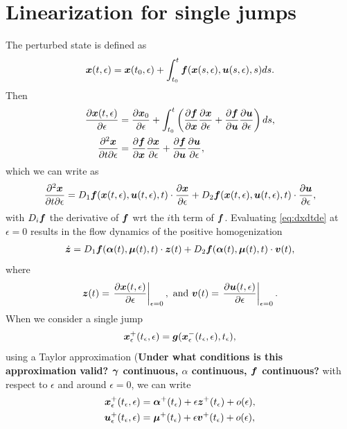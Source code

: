 \documentclass[DC2017114Bouma.tex]{subfiles}
\begin{document}
\section{Linearization for single jumps}
The perturbed state is defined as
\begin{align}
{\boldsymbol{x}}(t,\epsilon) = {\boldsymbol{x}}(t_0,\epsilon) + \int_{t_0}^{t}{\boldsymbol{f}}({\boldsymbol{x}}(s,\epsilon),{\boldsymbol{u}}(s,\epsilon),s)ds.
\end{align}
Then
\begin{align}
\frac{\partial{\boldsymbol{x}}(t,\epsilon)}{\partial\epsilon} &= \frac{\partial{\boldsymbol{x}}_0}{\partial\epsilon} + \int_{t_0}^{t}\left(\frac{\partial{\boldsymbol{f}}}{\partial{\boldsymbol{x}}}\frac{\partial{\boldsymbol{x}}}{\partial\epsilon} + \frac{\partial{\boldsymbol{f}}}{\partial{\boldsymbol{u}}}\frac{\partial{\boldsymbol{u}}}{\partial\epsilon}\right)ds,\\
\frac{\partial^2{\boldsymbol{x}}}{\partial t\partial\epsilon} &= \frac{\partial{\boldsymbol{f}}}{\partial{\boldsymbol{x}}}\frac{\partial{\boldsymbol{x}}}{\partial\epsilon} + \frac{\partial{\boldsymbol{f}}}{\partial{\boldsymbol{u}}}\frac{\partial{\boldsymbol{u}}}{\partial\epsilon},
\end{align}
which we can write as
\begin{align}
\frac{\partial^2{\boldsymbol{x}}}{\partial t\partial\epsilon} = D_1{\boldsymbol{f}}({\boldsymbol{x}}(t,\epsilon),{\boldsymbol{u}}(t,\epsilon),t)\cdot \frac{\partial{\boldsymbol{x}}}{\partial\epsilon} + D_2{\boldsymbol{f}}({\boldsymbol{x}}(t,\epsilon),{\boldsymbol{u}}(t,\epsilon),t)\cdot \frac{\partial{\boldsymbol{u}}}{\partial\epsilon}, \label{eq:dxdtde}
\end{align}
with $D_i{\boldsymbol{f}}$ the derivative of ${\boldsymbol{f}}$ wrt the $i$th term of ${\boldsymbol{f}}$. Evaluating \eqref{eq:dxdtde} at $\epsilon = 0$ results in the flow dynamics of the positive homogenization
\begin{align}
\dot{{\boldsymbol{z}}} = D_1{\boldsymbol{f}}(\boldsymbol{\alpha}(t),\boldsymbol{\mu}(t),t)\cdot {\boldsymbol{z}}(t) + D_2{\boldsymbol{f}}(\boldsymbol{\alpha}(t),\boldsymbol{\mu}(t),t)\cdot {\boldsymbol{v}}(t),
\end{align}
where 
\begin{align}
{\boldsymbol{z}}(t) = \left.\frac{\partial{\boldsymbol{x}}(t,\epsilon)}{\partial\epsilon}\right|_{\epsilon=0},\text{ and } {\boldsymbol{v}}(t) = \left.\frac{\partial{\boldsymbol{u}}(t,\epsilon)}{\partial\epsilon}\right|_{\epsilon=0} .
\end{align}
When we consider a single jump
\begin{align}
{\boldsymbol{x}}^{+}_\epsilon(t_\epsilon,\epsilon) = {\boldsymbol{g}}({\boldsymbol{x}}^{-}_\epsilon(t_\epsilon,\epsilon),t_\epsilon),\label{eq:g}
\end{align}
using a Taylor approximation (\textbf{Under what conditions is this approximation valid? $\boldsymbol{\gamma}$ continuous, $\alpha$ continuous, ${\boldsymbol{f}}$ continuous?} with respect to $\epsilon$ and around $\epsilon = 0$, we can write
\begin{align}
{\boldsymbol{x}}^{+}_\epsilon(t_\epsilon,\epsilon) &= \boldsymbol{\alpha}^{+}(t_\epsilon) + \epsilon {\boldsymbol{z}}^{+}(t_\epsilon) + o(\epsilon),\label{eq:xe}\\
{\boldsymbol{u}}^{+}_\epsilon(t_\epsilon,\epsilon) &= \boldsymbol{\mu}^{+}(t_\epsilon) + \epsilon {\boldsymbol{v}}^{+}(t_\epsilon) + o(\epsilon),\label{eq:ue}
\end{align}
\end{document}
